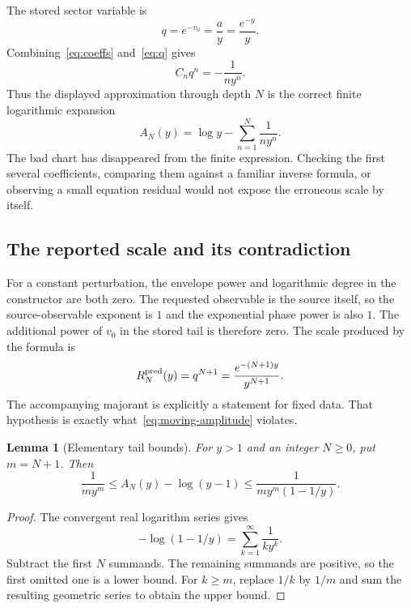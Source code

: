 \documentclass[11pt,letterpaper]{article}
\newtheorem{lemma}[proposition]{Lemma}
\begin{document}
The stored sector variable is
\begin{equation}
 q=e^{-v_0}=\frac{a}{y}=\frac{e^{-y}}{y}.
 \label{eq:q}
\end{equation}
Combining~\eqref{eq:coeffs} and~\eqref{eq:q} gives
\[
 C_nq^n=-\frac{1}{ny^n}.
\]
Thus the displayed approximation through depth $N$ is the correct finite logarithmic expansion
\begin{equation}
 A_N(y)=\log y-\sum_{n=1}^N\frac1{ny^n}.
 \label{eq:AN}
\end{equation}
The bad chart has disappeared from the finite expression. Checking the first several coefficients, comparing them against a familiar inverse formula, or observing a small equation residual would not expose the erroneous scale by itself.

\subsection{The reported scale and its contradiction}
For a constant perturbation, the envelope power and logarithmic degree in the constructor are both zero. The requested observable is the source itself, so the source-observable exponent is $1$ and the exponential phase power is also $1$. The additional power of $v_0$ in the stored tail is therefore zero. The scale produced by the formula is
\begin{equation}
 R_N^{\rm pred}(y)=q^{N+1}
 =\frac{e^{-(N+1)y}}{y^{N+1}}.
 \label{eq:bad-scale}
\end{equation}
The accompanying majorant is explicitly a statement for fixed data. That hypothesis is exactly what~\eqref{eq:moving-amplitude} violates.\cite{exp-core}

\begin{lemma}[Elementary tail bounds]
For $y>1$ and an integer $N\ge0$, put $m=N+1$. Then
\begin{equation}
 \frac1{m y^m}\le A_N(y)-\log(y-1)
 \le\frac1{m y^m(1-1/y)}.
 \label{eq:tail-bounds}
\end{equation}
\end{lemma}
\begin{proof}
The convergent real logarithm series gives
\[
 -\log(1-1/y)=\sum_{k=1}^\infty\frac1{k y^k}.
\]
Subtract the first $N$ summands. The remaining summands are positive, so the first omitted one is a lower bound. For $k\ge m$, replace $1/k$ by $1/m$ and sum the resulting geometric series to obtain the upper bound.
\end{proof}
\end{document}
